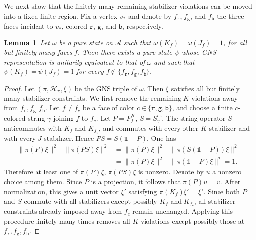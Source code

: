 \documentclass[a4paper,11pt]{article}
\newtheorem{lemma}[theorem]{Lemma}
\theoremstyle{definition}
\theoremstyle{remark}
\theoremstyle{remark}
\begin{document}
We next show that the finitely many remaining stabilizer violations can be moved into a fixed finite region. Fix a vertex $v_*$ and denote by $f_{\mathtt r}$, $f_{\mathtt g}$, and $f_{\mathtt b}$ the three faces incident to $v_*$, colored $\mathtt r$, $\mathtt g$, and $\mathtt b$, respectively.

\begin{lemma}\label{lem:sweep_violations}
    Let $\omega$ be a pure state on $\mathcal A$ such that $\omega(K_f)=\omega(J_f)=1$, for all but finitely many faces $f$. Then there exists a pure state $\psi$ whose GNS representation is unitarily equivalent to that of $\omega$ and such that $\psi(K_f)=\psi(J_f)=1$ for every $f\notin \{f_{\mathtt r},f_{\mathtt g},f_{\mathtt b}\}$. 
\end{lemma}

\begin{proof}
    Let $(\pi,\mathcal H_\pi,\xi)$ be the GNS triple of $\omega$. Then $\xi$ satisfies all but finitely many stabilizer constraints. We first remove the remaining $K$-violations away from $f_{\mathtt r},f_{\mathtt g},f_{\mathtt b}$. Let $f\neq f_{c}$ be a face of color $c\in\{\mathtt r,\mathtt g,\mathtt b\}$, and choose a finite $c$-colored string $\gamma$ joining $f$ to $f_{c}$. Let $P=P_f^K$, $S=S_\gamma^{cz}$. The string operator $S$ anticommutes with $K_f$ and $K_{f_{c}}$, and commutes with every other $K$-stabilizer and with every $J$-stabilizer. Hence $P S=S(\mathds{1}-P)$. One has 
    \begin{align*}
        \|\pi(P)\xi\|^2 + \|\pi(PS)\xi\|^2 & = \|\pi(P)\xi\|^2
        + \|\pi(S(\mathds{1}-P))\xi\|^2\\
        &= \|\pi(P)\xi\|^2 + \|\pi(\mathds{1}-P)\xi\|^2 =1.
    \end{align*}
    Therefore at least one of $\pi(P)\xi$, $\pi(PS)\xi$ is nonzero. Denote by $u$ a nonzero choice among them. Since $P$ is a projection, it follows that $\pi(P)u=u$. After normalization, this gives a unit vector $\xi'$ satisfying $\pi(K_f)\xi'=\xi'$. Since both $P$ and $S$ commute with all stabilizers except possibly $K_f$ and $K_{f_{c}}$, all stabilizer constraints already imposed away from $f_{c}$ remain unchanged. Applying this procedure finitely many times removes all $K$-violations except possibly those at $f_{\mathtt r},f_{\mathtt g},f_{\mathtt b}$. 
    

\end{proof}
\end{document}
